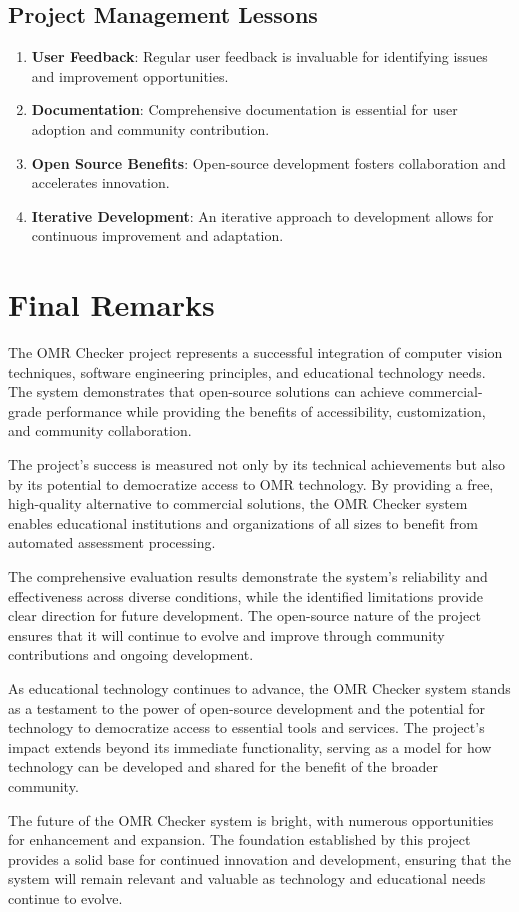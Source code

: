 \subsection{Project Management Lessons}

\begin{enumerate}
\item \textbf{User Feedback}: Regular user feedback is invaluable for identifying issues and improvement opportunities.

\item \textbf{Documentation}: Comprehensive documentation is essential for user adoption and community contribution.

\item \textbf{Open Source Benefits}: Open-source development fosters collaboration and accelerates innovation.

\item \textbf{Iterative Development}: An iterative approach to development allows for continuous improvement and adaptation.
\end{enumerate}

\section{Final Remarks}

The OMR Checker project represents a successful integration of computer vision techniques, software engineering principles, and educational technology needs. The system demonstrates that open-source solutions can achieve commercial-grade performance while providing the benefits of accessibility, customization, and community collaboration.

The project's success is measured not only by its technical achievements but also by its potential to democratize access to OMR technology. By providing a free, high-quality alternative to commercial solutions, the OMR Checker system enables educational institutions and organizations of all sizes to benefit from automated assessment processing.

The comprehensive evaluation results demonstrate the system's reliability and effectiveness across diverse conditions, while the identified limitations provide clear direction for future development. The open-source nature of the project ensures that it will continue to evolve and improve through community contributions and ongoing development.

As educational technology continues to advance, the OMR Checker system stands as a testament to the power of open-source development and the potential for technology to democratize access to essential tools and services. The project's impact extends beyond its immediate functionality, serving as a model for how technology can be developed and shared for the benefit of the broader community.

The future of the OMR Checker system is bright, with numerous opportunities for enhancement and expansion. The foundation established by this project provides a solid base for continued innovation and development, ensuring that the system will remain relevant and valuable as technology and educational needs continue to evolve.